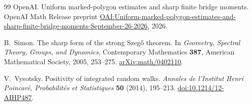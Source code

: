 \documentclass[11pt]{article}
\numberwithin{equation}{section}
\theoremstyle{definition}\newtheorem{definition}[theorem]{Definition}
\theoremstyle{remark}\newtheorem{remark}[theorem]{Remark}
\begin{document}
\begin{thebibliography}{99}
OpenAI.
Uniform marked-polygon estimates and sharp finite bridge moments.
OpenAI Math Release preprint
\href{https://github.com/openai/math/blob/main/preprints/Uniform-marked-polygon-estimates-and-sharp-finite-bridge-moments-September-26-2026/main.pdf}{OAI:Uniform-marked-polygon-estimates-and-sharp-finite-bridge-moments-September-26-2026},
2026.

B.~Simon. The sharp form of the strong Szeg\H{o} theorem.
In \emph{Geometry, Spectral Theory, Groups, and Dynamics},
Contemporary Mathematics \textbf{387}, American Mathematical Society,
2005, 253--275. \href{https://arxiv.org/abs/math/0402110}{arXiv:math/0402110}.

V.~Vysotsky. Positivity of integrated random walks.
\emph{Annales de l'Institut Henri Poincar\'e, Probabilit\'es et Statistiques}
\textbf{50} (2014), 195--213.
\href{https://doi.org/10.1214/12-AIHP487}{doi:10.1214/12-AIHP487}.
\end{thebibliography}
\end{document}
